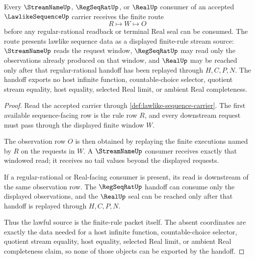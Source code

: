\begin{theorem}
\label{thm:lawlike-sequence-streamname-handoff}
Every $\StreamNameUp$, $\RegSeqRatUp$, or $\RealUp$ consumer of an accepted $\LawlikeSequenceUp$ carrier receives the finite route
$$
R\longmapsto W\longmapsto O
$$
before any regular-rational readback or terminal Real seal can be consumed. The route presents lawlike sequence data as a displayed finite-rule stream source: $\StreamNameUp$ reads the request window, $\RegSeqRatUp$ may read only the observations already produced on that window, and $\RealUp$ may be reached only after that regular-rational handoff has been replayed through $H,C,P,N$. The handoff exports no host infinite function, countable-choice selector, quotient stream equality, host equality, selected Real limit, or ambient Real completeness.
\end{theorem}
\begin{proof}
Read the accepted carrier through \autoref{def:lawlike-sequence-carrier}. The first available sequence-facing row is the rule row $R$, and every downstream request must pass through the displayed finite window $W$.

The observation row $O$ is then obtained by replaying the finite executions named by $R$ on the requests in $W$. A $\StreamNameUp$ consumer receives exactly that windowed read; it receives no tail values beyond the displayed requests.

If a regular-rational or Real-facing consumer is present, its read is downstream of the same observation row. The $\RegSeqRatUp$ handoff can consume only the displayed observations, and the $\RealUp$ seal can be reached only after that handoff is replayed through $H,C,P,N$.

Thus the lawful source is the finite-rule packet itself. The absent coordinates are exactly the data needed for a host infinite function, countable-choice selector, quotient stream equality, host equality, selected Real limit, or ambient Real completeness claim, so none of those objects can be exported by the handoff.
\end{proof}

